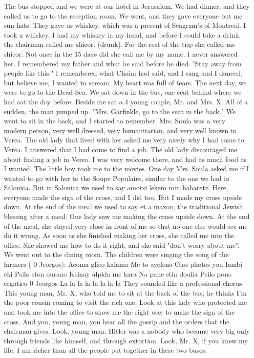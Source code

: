 The bus stopped and we were at our hotel in Jerusalem. We had 
dinner, and they called us to go to the reception room. We went, and 
they gave everyone but me sun hats. They gave us whiskey, which was a 
present of Seagram's of Montreal. I took a whiskey. I had my whiskey in 
my hand, and before I could take a drink, the chairman called me shicor. 
(drunk). For the rest of the trip she called me shicor. Not once in 
the 15 days did she call me by my name. I never answered her. I remembered my father and what he said before he died. "Stay away from people 
like this." I remembered what Chaim had said, and I sang and I danced, 
but believe me, I wanted to scream. My heart was full of tears. 
The next day, we were to go to the Dead Sea. We sat down in the 
bus, one seat behind where we had sat the day before. Beside me sat a 4 
young couple, Mr. and Mrs. X. All of a sudden, the man jumped up. 
"Mrs. Garfinkle, go to the seat in the back." We went to sit in the 
back, and I started to remember. 
Mrs. Soula was a very modern person, very well dressed, very humanitarian, and very well known in Verea. The old lady that lived with her asked me very nicely why I had come to Verea. I answered that I had come to find a job. The old lady discouraged me about finding a 
job in Verea. I was very welcome there, and had as much food as I wanted. The little boy took me to the movies. One day Mrs. Soula asked me if I wanted to go with her to the Soupe Populaire, similar to the one we had in Salonica. But in Salonica we used to say amotsi lekem min haharetz. Here, everyone made the sign of the cross, and I did too. 
But I made my cross upside down. At the end of the meal we used to say 
et a mazon, the traditional Jewish blessing after a meal. One 
lady saw me making the cross upside down. At the end of the meal, she 
stayed very close in front of me so that no-one else would see me do it 
wrong. As soon as she finished making her cross, she called me into the 
office. She showed me how to do it right, and she said "don't worry 
about me”.
We went out to the dining room. The children were singing the song of the farmers ( 0 Jeorgos): 
Acoma glico kalama 
Me to ayeleno 
Olos photos you Iambi eki 
Psila ston ourano 
Ksinay alpida me kara 
Na pane stin doulia 
Psilo pono ergatico 
0 Jeorgos La la la la la la la la 
They sounded like a professional chorus. 
This young man, Mr. X, who told me to sit at the back of the bus, 
he thinks I'm the poor cousin coming to visit the rich one. Look at 
this lady who protected me and took me into the office to show me the 
right way to make the sign of the cross. And you, young man, you hear 
all the gossip and the orders that the chairman gives. Look, young man. 
Hitler was a nobody who became very big only through friends like himself, and through extortion. Look, Mr. X, if you knew my life, I am 
richer than all the people put together in these two buses. 

